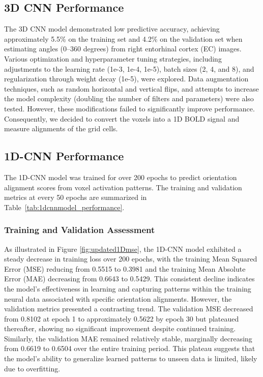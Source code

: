 \documentclass[a4paper]{article}
\begin{document}
\subsection{\textbf{3D CNN Performance}}
The 3D CNN model demonstrated low predictive accuracy, achieving approximately 5.5\% on the training set and 4.2\% on the validation set when estimating angles (0–360 degrees) from right entorhinal cortex (EC) images. Various optimization and hyperparameter tuning strategies, including adjustments to the learning rate (1e-3, 1e-4, 1e-5), batch sizes (2, 4, and 8), and regularization through weight decay (1e-5), were explored. Data augmentation techniques, such as random horizontal and vertical flips, and attempts to increase the model complexity (doubling the number of filters and parameters) were also tested. However, these modifications failed to significantly improve performance. Consequently, we decided to convert the voxels into a 1D BOLD signal and measure alignments of the grid cells.

\subsection{\textbf{1D-CNN Performance}}
The 1D-CNN model was trained for over 200 epochs to predict orientation alignment scores from voxel activation patterns. The training and validation metrics at every 50 epochs are summarized in Table~\ref{tab:1dcnnmodel_performance}.

\subsubsection{Training and Validation Assessment}
As illustrated in Figure \ref{fig:updated1Dmse}, the 1D-CNN model exhibited a steady decrease in training loss over 200 epochs, with the training Mean Squared Error (MSE) reducing from 0.5515 to 0.3981 and the training Mean Absolute Error (MAE) decreasing from 0.6643 to 0.5429. This consistent decline indicates the model's effectiveness in learning and capturing patterns within the training neural data associated with specific orientation alignments. However, the validation metrics presented a contrasting trend. The validation MSE decreased from 0.8102 at epoch 1 to approximately 0.5622 by epoch 30 but plateaued thereafter, showing no significant improvement despite continued training. Similarly, the validation MAE remained relatively stable, marginally decreasing from 0.6619 to 0.6504 over the entire training period. This plateau suggests that the model's ability to generalize learned patterns to unseen data is limited, likely due to overfitting.
\end{document}
